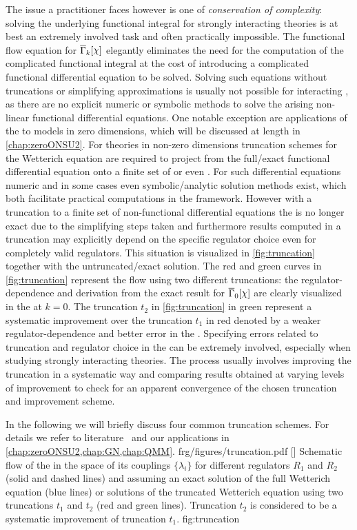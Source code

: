 The issue a \frg{} practitioner faces however is one of \textit{conservation of complexity}: solving the underlying functional integral for strongly interacting theories is at best an extremely involved task and often practically impossible.
The functional flow equation for $\FSeaa_k[\FSsf]$ elegantly eliminates the need for the computation of the complicated functional integral at the cost of introducing a complicated functional differential equation to be solved.
Solving such equations without truncations or simplifying approximations is usually not possible for interacting \qfts{}, as there are no explicit numeric or symbolic methods to solve the arising non-linear functional differential equations.
One notable exception are applications of the \frg{} to models in zero dimensions, which will be discussed at length in \cref{chap:zeroONSU2}.
For theories in non-zero dimensions truncation schemes for the Wetterich equation are required to project from the full/exact functional differential equation onto a finite set of \pdes{} or even \odes{}.
For such differential equations numeric and in some cases even symbolic/analytic solution methods exist, which both facilitate practical computations in the \frg{} framework.
However with a truncation to a finite set of non-functional differential equations the \frg{} is no longer exact due to the simplifying steps taken and furthermore results computed in a truncation may explicitly depend on the specific regulator choice even for completely valid regulators.
This situation is visualized in \cref{fig:truncation} together with the untruncated/exact solution.
The red and green curves in \cref{fig:truncation} represent the flow using two different truncations: the regulator-dependence and derivation from the exact result for $\FSeaa_0[\FSsf]$ are clearly visualized in the \ir{} at $k=0$.
The truncation $t_2$ in \cref{fig:truncation} in green represent a systematic improvement over the truncation $t_1$ in red denoted by a weaker regulator-dependence and better error in the \ir{}.
Specifying errors related to truncation and regulator choice in the \frg{} can be extremely involved, especially when studying strongly interacting theories.
The process usually involves improving the truncation in a systematic way and comparing results obtained at varying levels of improvement to check for an apparent convergence of the chosen truncation and improvement scheme.

In the following we will briefly discuss four common truncation schemes. For details we refer to literature~\cite{Berges:2000ew,PawlowskiScript,Gies:2006wv,Kopietz:2010zz,Wetterich:2001kra,Pawlowski:2005xe,Rosten:2010vm,Delamotte:2007pf,Dupuis:2020fhh} and our applications in \cref{chap:zeroONSU2,chap:GN,chap:QMM}.
\fullWidthFigure%
	{frg/figures/truncation.pdf}%
	[]%
	{Schematic \frg{} flow \dash{} \rgscaleevolution{} of the \eaa{} in the space of its couplings $\{\lambda_i\}$ for different regulators $R_1$ and $R_2$ (solid and dashed lines) and assuming an exact solution of the full Wetterich equation (blue lines) or solutions of the truncated Wetterich equation using two truncations $t_1$ and $t_2$ (red and green lines). Truncation $t_2$ is considered to be a systematic improvement of truncation $t_1$. }%
	{fig:truncation}%

